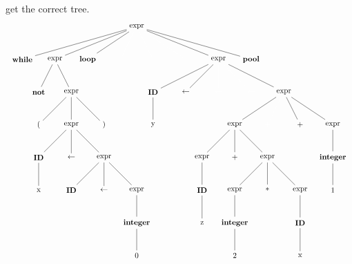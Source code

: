\documentclass[10pt]{article}
\begin{document}
\begin{enumerate}
get the correct tree.
             \[
              \begin{array}{cll}
                \begin{tikzpicture}
                  \node  {expr}
                    child{node  {\textbf{while}}}
                    child{node  {expr}
                      child{node{\textbf{not}}}
                      child{node{expr}
                        child{node  {(}}
                        child{node  {expr}
                          child{node{\textbf{ID}}
                            child{node{x}}}
                          child{node{$\leftarrow$}}
                          child{node{expr}
                            child{node  {\textbf{ID}}}
                            child{node  {$\leftarrow$}}
                            child{node  {expr}
                              child{node  {\textbf{integer}}
                              child{node  {0}}}}
                            }
                          }
                        child{node  {)}}}}
                    child{node  {\textbf{loop}}}
                    child[color=white]{node  {}}
                    child[color=white]{node  {}}
                    child[color=white]{node  {}}
                    child{node  {expr}
                      child{node  {\textbf{ID}}
                        child{node  {y}}}
                      child{node  {$\leftarrow$}}
                      child[color=white]{node  {$\leftarrow$}}
                      child[color=white]{node  {$\leftarrow$}}
                      child{node  {expr}
                        child{node  {expr}
                          child{node  {expr}
                            child{node  {\textbf{ID}}
                              child{node  {z}}}}
                          child{node  {+}}
                          child{node  {expr}
                            child{node  {expr}
                              child{node  {\textbf{integer}}
                                child{node  {2}}}}
                            child{node  {*}}
                            child{node  {expr}
                              child{node  {\textbf{ID}}
                                child{node  {x}}}}
                            }
                          }
                        child[color=white]{node  {+}}
                        child{node  {+}}
                        child{node  {expr}
                          child{node  {\textbf{integer}}
                            child{node  {1}}}}}}
                    child{node  {\textbf{pool}}};
                  \end{tikzpicture}
                \end{array}
            \]


\end{enumerate}
\end{document}
